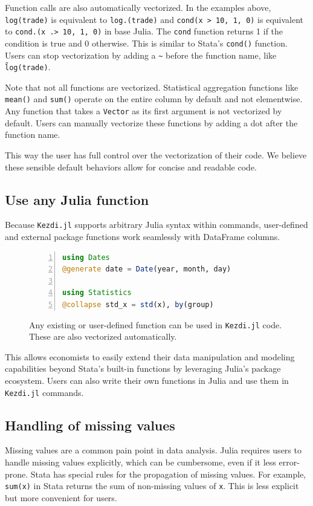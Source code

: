\documentclass{juliacon}
\begin{document}
Function calls are also automatically vectorized. In the examples above, \texttt{log(trade)} is equivalent to \texttt{log.(trade)} and \texttt{cond(x > 10, 1, 0)} is equivalent to \texttt{cond.(x .> 10, 1, 0)} in base Julia. The \texttt{cond} function returns 1 if the condition is true and 0 otherwise. This is similar to Stata's \texttt{cond()} function. Users can stop vectorization by adding a \texttt{\~} before the function name, like \texttt{\~log(trade)}.

Note that not all functions are vectorized. Statistical aggregation functions like \texttt{mean()} and \texttt{sum()} operate on the entire column by default and not elementwise. Any function that takes a \texttt{Vector} as its first argument is not vectorized by default. Users can manually vectorize these functions by adding a dot after the function name.

This way the user has full control over the vectorization of their code. We believe these sensible default behaviors allow for concise and readable code.

\subsection{Use any Julia function}

Because \texttt{Kezdi.jl} supports arbitrary Julia syntax within commands, user-defined and external package functions work seamlessly with DataFrame columns.

\begin{figure}[h!]
\begin{lstlisting}[language = Julia, numbers=left, numberstyle=\tiny\color{gray}]
using Dates
@generate date = Date(year, month, day)

using Statistics
@collapse std_x = std(x), by(group) 
\end{lstlisting}
	
\caption{Any existing or user-defined function can be used in \texttt{Kezdi.jl} code. These are also vectorized automatically.}
\label{fig:vectorization}
\end{figure}

This allows economists to easily extend their data manipulation and modeling capabilities beyond Stata's built-in functions by leveraging Julia's package ecosystem. Users can also write their own functions in Julia and use them in \texttt{Kezdi.jl} commands. 

\subsection{Handling of missing values}
Missing values are a common pain point in data analysis. Julia requires users to handle missing values explicitly, which can be cumbersome, even if it less error-prone. Stata has special rules for the propagation of missing values. For example, \texttt{sum(x)} in Stata returns the sum of non-missing values of \texttt{x}. This is less explicit but more convenient for users.
\end{document}
